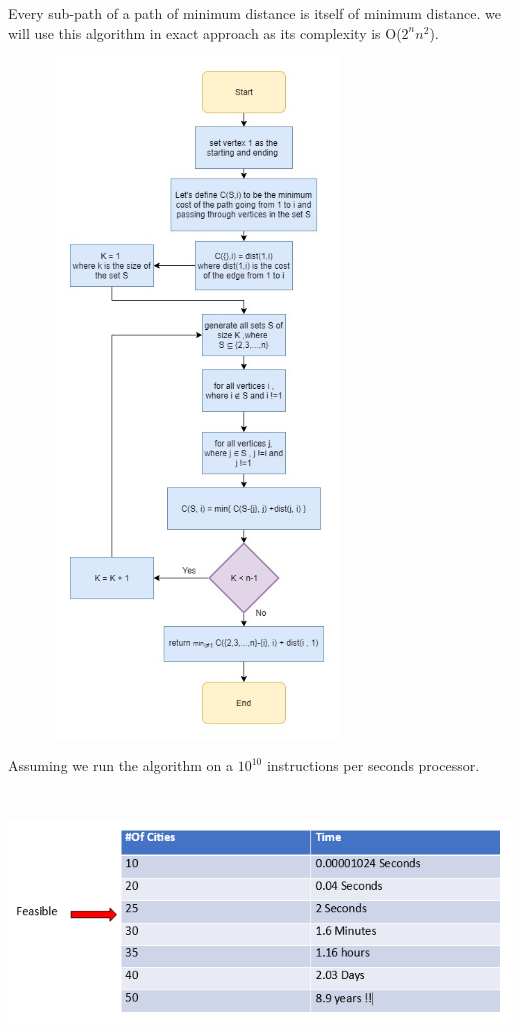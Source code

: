 \documentclass[12pt]{article}
\newcounter{subsubsubsection}[subsubsection]
\begin{document}
Every sub-path of a path of minimum distance is itself of minimum distance. we will use this algorithm in exact approach as its complexity is O($2^n  n^2$).
\begin{center}
	\includegraphics[width=10cm,height=18cm]{./assets/flowchart/held-karp.png}\\
\end{center}

Assuming we run the algorithm on a $10^10$ instructions per seconds processor.
\begin{center}
	\includegraphics[width=15cm,height=7cm]{./assets/example/db-time.png}\\
\end{center}
\end{document}
